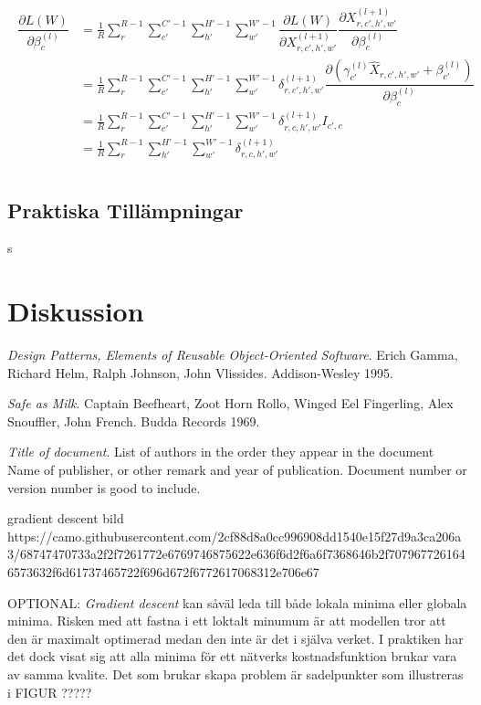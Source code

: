 \documentclass[a4paper,11pt,twoside]{article}
\newcommand*{\pd}[2]{\ensuremath{\dfrac{\partial #1}{\partial #2}}}
\begin{document}
\begin{align}
\begin{split}
	\pd{L(W)}{\beta^{(l)}_{c}}
		& = \frac{1}{R}\sum^{R-1}_{r} \sum^{C'-1}_{c'} \sum^{H'-1}_{h'} \sum^{W'-1}_{w'} \pd{L(W)}{X^{(l+1)}_{r,c',h',w'}} \pd{X^{(l+1)}_{r,c',h',w'}}{\beta^{(l)}_{c}} \\
		& = \frac{1}{R}\sum^{R-1}_{r} \sum^{C'-1}_{c'} \sum^{H'-1}_{h'} \sum^{W'-1}_{w'} \delta^{(l+1)}_{r,c',h',w'}  \pd{({\gamma_{c'}^{(l)} \hat{X}_{r,c',h',w'} + \beta_{c'}^{(l)}})}{\beta^{(l)}_{c}} \\
		& = \frac{1}{R}\sum^{R-1}_{r} \sum^{C'-1}_{c'} \sum^{H'-1}_{h'} \sum^{W'-1}_{w'} \delta^{(l+1)}_{r,c,h',w'} I_{c',c}\\
		& = \frac{1}{R}\sum^{R-1}_{r} \sum^{H'-1}_{h'} \sum^{W'-1}_{w'} \delta^{(l+1)}_{r,c,h',w'} \\
\end{split}
\end{align}

\subsection{Praktiska Tillämpningar}
s
\section{Diskussion}




\begin{thebibliography}{99}
    \textit{Design Patterns, Elements of Reusable
    Object-Oriented Software}.
    Erich Gamma, Richard Helm, Ralph Johnson, John Vlissides. 
    Addison-Wesley 1995.

    \textit{Safe as Milk}. 
    Captain Beefheart, Zoot Horn Rollo, Winged Eel Fingerling, 
    Alex Snouffler, John French. 
    Budda Records 1969.

    \textit{Title of document}. 
    List of authors in the order they appear in the document 
    Name of publisher, or other remark and year of publication. 
    Document number or version number is good to include. 
    
gradient descent bild https://camo.githubusercontent.com/2cf88d8a0cc996908dd1540e15f27d9a3ca206a3/68747470733a2f2f7261772e6769746875622e636f6d2f6a6f7368646b2f7079677261646573632f6d61737465722f696d672f6772617068312e706e67
\end{thebibliography}

OPTIONAL:
\textit{Gradient descent} kan såväl leda till både lokala minima eller globala minima. Risken med att fastna i ett loktalt minumum är att modellen tror att den är maximalt optimerad medan den inte är det i själva verket. I praktiken har det dock visat sig att alla minima för ett nätverks kostnadsfunktion brukar vara av samma kvalite. Det som brukar skapa problem är sadelpunkter som illustreras i FIGUR ?????
\end{document}
